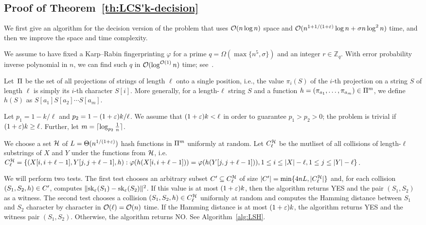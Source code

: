 \subsection{Proof of Theorem~\ref{th:LCS'k-decision}}\label{lcs:sec:decision}
We first give an algorithm for the decision version of the \kApproxLCS problem that uses $\mathcal{O}(n \log n)$ space and $\mathcal{O}(n^{1+1/(1+\varepsilon)} \log n + \sigma n \log^2 n)$ time, and then we improve the space and time complexity. 

We assume to have fixed a Karp--Rabin fingerprinting $\varphi$ for a prime $q = \Omega(\max\{n^5, \sigma\})$ and an integer $r \in \mathbb{Z}_q$. With error probability inverse polynomial in $n$, we can find such $q$ in $\mathcal{O}(\log^{\mathcal{O}(1)}n)$ time;
see~\cite{DBLP:journals/moc/TaoCH12,AKS}. 

Let~$\Pi$ be the set of all projections of strings of length $\ell$ onto a single position, i.e., the value $\pi_i(S)$ of the $i$-th projection on a string $S$ of length $\ell$ is simply its $i$-th character $S[i]$. More generally, for a length-$\ell$ string $S$ and a function $h=(\pi_{a_1},\ldots,\pi_{a_m}) \in \Pi^m$, we define $h(S)$ as $S[a_{1}] S[a_{2}] \cdots S[a_{m}]$.

Let $p_1 = 1 - k / \ell$ and $p_2 = 1 - (1+\varepsilon) k / \ell$. We assume that $(1+\varepsilon) k< \ell$ in order to guarantee $p_1>p_2>0$; the problem is trivial if $(1+\varepsilon)k \ge \ell$. 
Further, let $m = \lceil \log_{p_2}{\tfrac{1}{n}} \rceil$.

We choose a set $\mathcal{H}$ of $L = \Theta(n^{1/(1+\varepsilon)})$ hash functions in $\Pi^m$ uniformly at random. Let $C^{\mathcal{H}}_{\ell}$ be the mutliset of all collisions of length-$\ell$ substrings of $X$ and $Y$ under the functions from $\mathcal{H}$, i.e. $C^{\mathcal{H}}_{\ell} = \{(X[i,i+\ell-1], Y[j,j+\ell-1],h) : \varphi(h(X[i,i+\ell-1])) = \varphi(h(Y[j,j+\ell-1])), 1 \le i \le |X|-\ell, 1 \le j \le |Y|-\ell\}$. 

We will perform two tests. The first test chooses an arbitrary subset $C'\subseteq C^{\mathcal{H}}_{\ell}$ of size $|C'|=\min\{4nL, |C^{\mathcal{H}}_{\ell}|\}$ and, for each collision $(S_1, S_2, h)\in C'$, computes $\lVert\mathrm{sk}_\varepsilon(S_1) - \mathrm{sk}_\varepsilon (S_2)\rVert^2$. If this value is at most $(1+\varepsilon) k$, then the algorithm returns YES and the pair $(S_1, S_2)$ as a witness. The second test chooses a collision $(S_1, S_2, h) \in C^{\mathcal{H}}_{\ell}$ uniformly at random and computes the Hamming distance between $S_1$ and $S_2$ character by character in $\mathcal{O}(\ell) = \mathcal{O}(n)$ time. If the Hamming distance is at most $(1+\varepsilon)k$, the algorithm returns YES and the witness pair $(S_1, S_2)$. Otherwise, the algorithm returns NO. See Algorithm~\ref{alg:LSH}.

